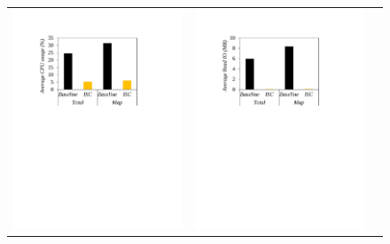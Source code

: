 \begin{figure}[t]
  \centering
  \renewcommand{\tabcolsep}{1mm}
  \begin{tabular}{ccc}
 \includegraphics[width=0.66\columnwidth]{figures/Hadoop_average_CPU_usage.pdf}&
  \includegraphics[width=0.66\columnwidth]{figures/Hadoop_average_read_io.pdf}&

\end{tabular}
\end{figure}
